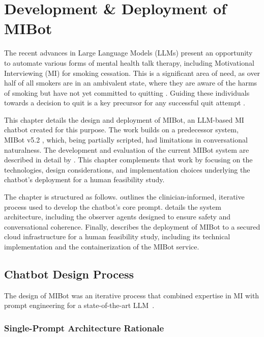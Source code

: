 \chapter{Development \& Deployment of MIBot}
\label{ch:mibot}

The recent advances in Large Language Models (LLMs) present an opportunity to automate various forms of mental health talk therapy, including Motivational Interviewing (MI) for smoking cessation. This is a significant area of need, as over half of all smokers are in an ambivalent state, where they are aware of the harms of smoking but have not yet committed to quitting \citep{Babb2017}. Guiding these individuals towards a decision to quit is a key precursor for any successful quit attempt \citep{West2006}.

This chapter details the design and deployment of MIBot, an LLM-based MI chatbot created for this purpose. The work builds on a predecessor system, MIBot v5.2 \citep{brown2023mi}, which, being partially scripted, had limitations in conversational naturalness. The development and evaluation of the current MIBot system are described in detail by \citet{mahmood-etal-2025-fully}. This chapter complements that work by focusing on the technologies, design considerations, and implementation choices underlying the chatbot's deployment for a human feasibility study.

The chapter is structured as follows.  outlines the clinician-informed, iterative process used to develop the chatbot's core prompt.  details the system architecture, including the observer agents designed to ensure safety and conversational coherence. Finally,  describes the deployment of MIBot to a secured cloud infrastructure for a human feasibility study, including its technical implementation and the containerization of the MIBot service.




\section{Chatbot Design Process}
\label{sec:iterative-development}

The design of MIBot was an iterative process that combined expertise in MI with prompt engineering for a state-of-the-art LLM~\citep{openai2024gpt4ocard}.

\subsection{Single-Prompt Architecture Rationale}
\label{sec:single-prompt-rationale}

